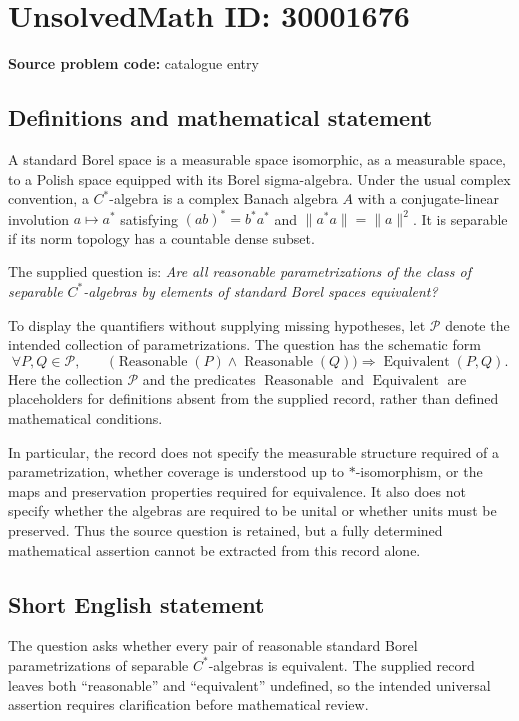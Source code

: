 \documentclass[11pt]{article}
\begin{document}
\section*{UnsolvedMath ID: 30001676}
\textbf{Source problem code:} catalogue entry
\subsection{Definitions and mathematical statement}
A standard Borel space is a measurable space isomorphic, as a measurable space, to a Polish space equipped with its Borel sigma-algebra. Under the usual complex convention, a \(C^*\)-algebra is a complex Banach algebra \(A\) with a conjugate-linear involution \(a\mapsto a^*\) satisfying \((ab)^*=b^*a^*\) and \(\lVert a^*a\rVert=\lVert a\rVert^2\). It is separable if its norm topology has a countable dense subset.

The supplied question is: \emph{Are all reasonable parametrizations of the class of separable \(C^*\)-algebras by elements of standard Borel spaces equivalent?}

To display the quantifiers without supplying missing hypotheses, let \(\mathscr P\) denote the intended collection of parametrizations. The question has the schematic form
\[
\forall P,Q\in\mathscr P,\qquad
\bigl(\operatorname{Reasonable}(P)\land\operatorname{Reasonable}(Q)\bigr)
\Longrightarrow \operatorname{Equivalent}(P,Q).
\]
Here the collection \(\mathscr P\) and the predicates \(\operatorname{Reasonable}\) and \(\operatorname{Equivalent}\) are placeholders for definitions absent from the supplied record, rather than defined mathematical conditions.

In particular, the record does not specify the measurable structure required of a parametrization, whether coverage is understood up to \(*\)-isomorphism, or the maps and preservation properties required for equivalence. It also does not specify whether the algebras are required to be unital or whether units must be preserved. Thus the source question is retained, but a fully determined mathematical assertion cannot be extracted from this record alone.
\subsection{Short English statement}
The question asks whether every pair of reasonable standard Borel parametrizations of separable \(C^*\)-algebras is equivalent. The supplied record leaves both ``reasonable'' and ``equivalent'' undefined, so the intended universal assertion requires clarification before mathematical review.
\end{document}
